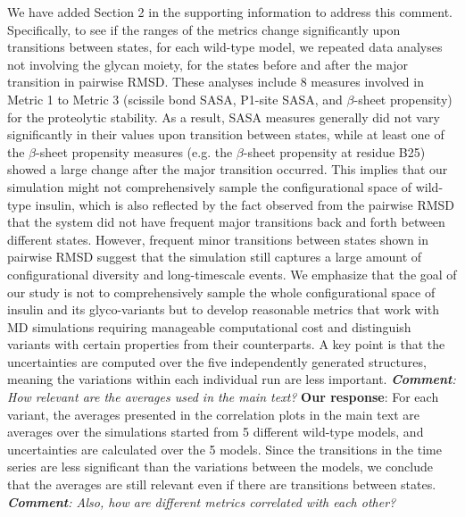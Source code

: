 \documentclass[9pt]{elife}
\begin{document}
We have added Section 2 in the supporting information to address this comment. Specifically, to see if the ranges of the metrics change significantly upon transitions between states, for each wild-type model, we repeated data analyses not involving the glycan moiety, for the states before and after the major transition in pairwise RMSD. These analyses include 8 measures involved in Metric 1 to Metric 3 (scissile bond SASA, P1-site SASA, and $\beta$-sheet propensity) for the proteolytic stability. As a result, SASA measures generally did not vary significantly in their values upon transition between states, while at least one of the $\beta$-sheet propensity measures (e.g. the $\beta$-sheet propensity at residue B25) showed a large change after the major transition occurred. This implies that our simulation might not comprehensively sample the configurational space of wild-type insulin, which is also reflected by the fact observed from the pairwise RMSD that the system did not have frequent major transitions back and forth between different states. However, frequent minor transitions between states shown in pairwise RMSD suggest that the simulation still captures a large amount of configurational diversity and long-timescale events. We emphasize that the goal of our study is not to comprehensively sample the whole configurational space of insulin and its glyco-variants but to develop reasonable metrics that work with MD simulations requiring manageable computational cost and distinguish variants with certain properties from their counterparts.  A key point is that the uncertainties are computed over the five independently generated structures, meaning the variations within each individual run are less important. 
\newline
\newline
\indent
\textit{\textbf{Comment}:
How relevant are the averages used in the main text?}
\newline
\indent 
{\bf Our response}: 
For each variant, the averages presented in the correlation plots in the main text are averages over the simulations started from 5 different wild-type models, and uncertainties are calculated over the 5 models. Since the transitions in the time series are less significant than the variations between the models, we conclude that the averages are still relevant even if there are transitions between states.
\newline
\newline
\indent
\textit{\textbf{Comment}: Also, how are different metrics correlated with each other?}
\end{document}
